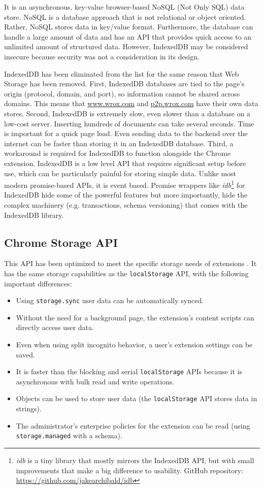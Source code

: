 It is an asynchronous, key-value browser-based NoSQL (Not Only SQL) data store. NoSQL is a database approach that is not relational or object oriented. Rather, NoSQL stores data in key/value format. Furthermore, the database can handle a large amount of data and has an API that provides quick access to an unlimited amount of structured data. However, IndexedDB may be considered insecure because security was not a consideration in its design.

IndexedDB has been eliminated from the list for the same reason that Web Storage has been removed. First, IndexedDB databases are tied to the page's origin (protocol, domain, and port), so information cannot be shared across domains. This means that \url{www.wrox.com} and \url{p2p.wrox.com} have their own data stores. Second, IndexedDB is extremely slow, even slower than a database on a low-cost server. Inserting hundreds of documents can take several seconds. Time is important for a quick page load. Even sending data to the backend over the internet can be faster than storing it in an IndexedDB database. Third, a workaround is required for IndexedDB to function alongside the Chrome extension. IndexedDB is a low level API that requires significant setup before use, which can be particularly painful for storing simple data. Unlike most modern promise-based APIs, it is event based. Promise wrappers like \emph{idb}\footnote{\emph{idb} is a tiny library that mostly mirrors the IndexedDB API, but with small improvements that make a big difference to usability. GitHub repository: \url{https://github.com/jakearchibald/idb}} for IndexedDB hide some of the powerful features but more importantly, hide the complex machinery (e.g. transactions, schema versioning) that comes with the IndexedDB library.

\subsection*{Chrome Storage API}
This API has been optimized to meet the specific storage needs of extensions \autocite{chrome2021storage}. It has the same storage capabilities as the \verb;localStorage; API, with the following important differences:

\begin{itemize}
  \item Using \verb;storage.sync; user data can be automatically synced.
  \item Without the need for a background page, the extension's content scripts can directly access user data.
  \item Even when using split incognito behavior, a user's extension settings can be saved.
  \item It is faster than the blocking and serial \verb;localStorage; APIs because it is asynchronous with bulk read and write operations.
  \item Objects can be used to store user data (the \verb;localStorage; API stores data in strings).
  \item The administrator's enterprise policies for the extension can be read (using \verb;storage.managed; with a schema).
\end{itemize}

